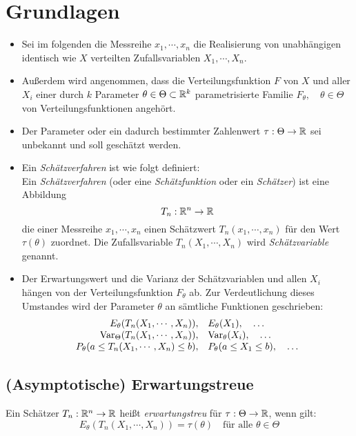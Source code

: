	\section{Grundlagen}
		\begin{itemize}
			\item Sei im folgenden die Messreihe \(x_1, \cdots, x_n\) die Realisierung von unabhängigen identisch wie \(X\) verteilten Zufallsvariablen \(X_1, \cdots, X_n\).
			\item Außerdem wird angenommen, dass die Verteilungsfunktion \(F\) von \(X\) und aller \(X_i\) einer durch \(k\) Parameter \( \theta \in \Theta \subset \mathbb{R}^k \) parametrisierte Familie \( F_\theta, \quad \theta \in \Theta \) von Verteilungsfunktionen angehört.
			\item Der Parameter oder ein dadurch bestimmter Zahlenwert \( \tau : \Theta \rightarrow \mathbb{R} \) sei unbekannt und soll geschätzt werden.
			\item Ein \textit{Schätzverfahren} ist wie folgt definiert: \\ Ein \textit{Schätzverfahren} (oder eine \textit{Schätzfunktion} oder ein \textit{Schätzer}) ist eine Abbildung \[ T_n : \mathbb{R}^n \rightarrow \mathbb{R} \] die einer Messreihe \( x_1, \cdots, x_n \) einen Schätzwert \( T_n(x_1, \cdots, x_n) \) für den Wert \( \tau(\theta) \) zuordnet. Die Zufallsvariable \( T_n(X_1, \cdots, X_n) \) wird \textit{Schätzvariable} genannt.
			\item Der Erwartungswert und die Varianz der Schätzvariablen und allen \(X_i\) hängen von der Verteilungsfunktion \(F_\theta\) ab. Zur Verdeutlichung dieses Umstandes wird der Parameter \(\theta\) an sämtliche Funktionen geschrieben:
				\begin{equation*}
					\begin{array}{rl}
						E_\theta(T_n(X_1, \cdots, X_n)),               & E_\theta(X_1), \quad \dots               \\
						\operatorname{Var}_\Theta(T_n(X_1, \cdots, X_n)),            & \operatorname{Var}_\theta(X_i), \quad \dots            \\
						P_\theta(a \leq T_n(X_1, \cdots, X_n) \leq b), & P_\theta(a \leq X_1 \leq b), \quad \dots
					\end{array}
				\end{equation*}
		\end{itemize}

		\subsection{(Asymptotische) Erwartungstreue}
			Ein Schätzer \( T_n : \mathbb{R}^n \rightarrow \mathbb{R} \) heißt \textit{erwartungstreu} für \( \tau : \Theta \rightarrow \mathbb{R} \), wenn gilt:
			\begin{equation*}
				E_\theta(T_n(X_1, \cdots, X_n)) = \tau(\theta) \quad \textrm{für alle } \theta \in \Theta
			\end{equation*}

